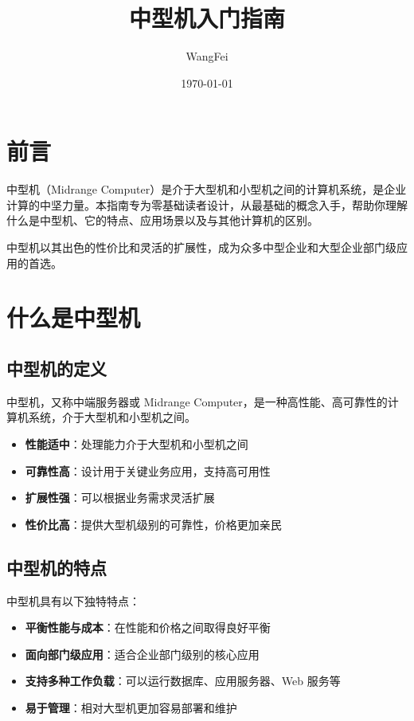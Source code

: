 \documentclass[12pt,UTF8]{ctexbook}
\title{\heiti\zihao{0} 中型机入门指南}
\author{WangFei}
\date{\today}
\begin{document}
\maketitle
\tableofcontents

\frontmatter
\chapter{前言}

中型机（Midrange Computer）是介于大型机和小型机之间的计算机系统，是企业计算的中坚力量。本指南专为零基础读者设计，从最基础的概念入手，帮助你理解什么是中型机、它的特点、应用场景以及与其他计算机的区别。

中型机以其出色的性价比和灵活的扩展性，成为众多中型企业和大型企业部门级应用的首选。

\mainmatter

\chapter{什么是中型机}
\label{chap:what_is_midrange}

\section{中型机的定义}

中型机，又称中端服务器或 Midrange Computer，是一种高性能、高可靠性的计算机系统，介于大型机和小型机之间。

\begin{itemize}[leftmargin=2cm]
    \item \textbf{性能适中}：处理能力介于大型机和小型机之间
    \item \textbf{可靠性高}：设计用于关键业务应用，支持高可用性
    \item \textbf{扩展性强}：可以根据业务需求灵活扩展
    \item \textbf{性价比高}：提供大型机级别的可靠性，价格更加亲民
\end{itemize}

\section{中型机的特点}

中型机具有以下独特特点：

\begin{itemize}[leftmargin=2cm]
    \item \textbf{平衡性能与成本}：在性能和价格之间取得良好平衡
    \item \textbf{面向部门级应用}：适合企业部门级别的核心应用
    \item \textbf{支持多种工作负载}：可以运行数据库、应用服务器、Web 服务等
    \item \textbf{易于管理}：相对大型机更加容易部署和维护
\end{itemize}
\end{document}
